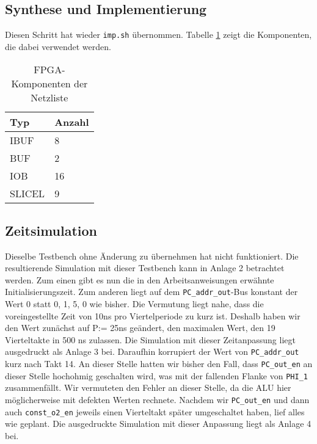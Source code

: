 \documentclass[12pt,a4paper]{scrartcl}
\begin{document}
\subsection{Synthese und Implementierung}
Diesen Schritt hat wieder \texttt{imp.sh} \"ubernommen.
Tabelle \ref{netzliste} zeigt die Komponenten, die dabei verwendet werden.

\begin{table}[h]
    \centering
    \begin{tabular}{l|l}
    \hline
    Typ     & Anzahl  \\
    \hline
    IBUF    & 8       \\ %
    BUF     & 2       \\ %
    IOB     & 16      \\ %
    SLICEL  & 9       \\
    \hline
    \end{tabular}
    \caption{FPGA-Komponenten der Netzliste}
    \label{netzliste}
\end{table}

\subsection{Zeitsimulation}
Dieselbe Testbench ohne \"Anderung zu \"ubernehmen hat nicht funktioniert. Die resultierende Simulation mit dieser Testbench kann in Anlage 2 betrachtet werden.
Zum einen gibt es nun die in den Arbeitsanweisungen erw\"ahnte Initialisierungszeit.
Zum anderen liegt auf dem \texttt{PC\_addr\_out}-Bus konstant der Wert 0 statt 0, 1, 5, 0 wie bisher.
Die Vermutung liegt nahe, dass die voreingestellte Zeit von 10ns pro Viertelperiode zu kurz ist.
Deshalb haben wir den Wert zun\"achst auf P:= 25ns ge\"andert, den maximalen Wert, den 19 Vierteltakte in 500 ns zulassen. Die Simulation mit dieser Zeitanpassung liegt ausgedruckt als Anlage 3 bei.
Daraufhin korrupiert der Wert von \texttt{PC\_addr\_out} kurz nach Takt 14.
An dieser Stelle hatten wir bisher den Fall, dass \texttt{PC\_out\_en} an dieser Stelle hochohmig geschalten wird, was mit der fallenden Flanke von \texttt{PHI\_1} zusammenf\"allt.
Wir vermuteten den Fehler an dieser Stelle, da die ALU hier m\"oglicherweise mit defekten Werten rechnete.
Nachdem wir \texttt{PC\_out\_en} und dann auch \texttt{const\_o2\_en} jeweils einen Vierteltakt sp\"ater umgeschaltet haben, lief alles wie geplant.
Die ausgedruckte Simulation mit dieser Anpassung liegt als Anlage 4 bei.
\end{document}
